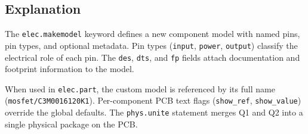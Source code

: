 \subsection{Explanation}
The \texttt{elec.makemodel} keyword defines a new component model with named pins, pin types, and optional metadata. Pin types (\texttt{input}, \texttt{power}, \texttt{output}) classify the electrical role of each pin. The \texttt{des}, \texttt{dts}, and \texttt{fp} fields attach documentation and footprint information to the model.

When used in \texttt{elec.part}, the custom model is referenced by its full name (\texttt{mosfet/C3M0016120K1}). Per-component PCB text flags (\texttt{show\_ref}, \texttt{show\_value}) override the global defaults. The \texttt{phys.unite} statement merges Q1 and Q2 into a single physical package on the PCB.

